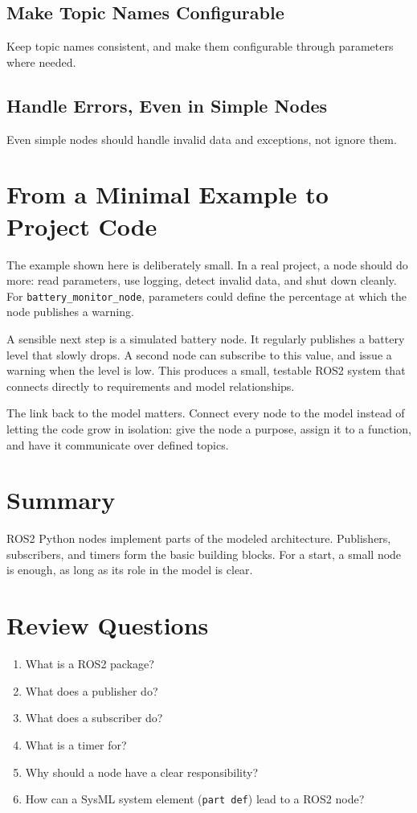 \subsection{Make Topic Names Configurable}
Keep topic names consistent, and make them configurable through parameters where needed.

\subsection{Handle Errors, Even in Simple Nodes}
Even simple nodes should handle invalid data and exceptions, not ignore them.

\section{From a Minimal Example to Project Code}
The example shown here is deliberately small. In a real project, a node should do more: read parameters, use logging, detect invalid data, and shut down cleanly. For \texttt{battery\_monitor\_node}, parameters could define the percentage at which the node publishes a warning.

A sensible next step is a simulated battery node. It regularly publishes a battery level that slowly drops. A second node can subscribe to this value, and issue a warning when the level is low. This produces a small, testable ROS2 system that connects directly to requirements and model relationships.

The link back to the model matters. Connect every node to the model instead of letting the code grow in isolation: give the node a purpose, assign it to a function, and have it communicate over defined topics.

\section{Summary}
ROS2 Python nodes implement parts of the modeled architecture. Publishers, subscribers, and timers form the basic building blocks. For a start, a small node is enough, as long as its role in the model is clear.

\section{Review Questions}
\begin{enumerate}
    \item What is a ROS2 package?
    \item What does a publisher do?
    \item What does a subscriber do?
    \item What is a timer for?
    \item Why should a node have a clear responsibility?
    \item How can a SysML system element (\texttt{part def}) lead to a ROS2 node?
\end{enumerate}

